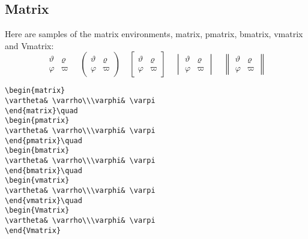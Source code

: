 \documentclass[draft]{amsart}
\newcommand{\ntt}{\normalfont\ttfamily}
\newcommand{\cn}[1]{{\protect\ntt\bslash#1}}
\theoremstyle{definition}
\theoremstyle{remark}
\begin{document}
\subsection{Matrix}

Here are samples of the matrix environments,
\cn{matrix}, \cn{pmatrix}, \cn{bmatrix}, \cn{vmatrix} and \cn{Vmatrix}:
\begin{equation}
\begin{matrix}
\vartheta& \varrho\\\varphi& \varpi
\end{matrix}\quad
\begin{pmatrix}
\vartheta& \varrho\\\varphi& \varpi
\end{pmatrix}\quad
\begin{bmatrix}
\vartheta& \varrho\\\varphi& \varpi
\end{bmatrix}\quad
\begin{vmatrix}
\vartheta& \varrho\\\varphi& \varpi
\end{vmatrix}\quad
\begin{Vmatrix}
\vartheta& \varrho\\\varphi& \varpi
\end{Vmatrix}
\end{equation}
\begin{verbatim}
\begin{matrix}
\vartheta& \varrho\\\varphi& \varpi
\end{matrix}\quad
\begin{pmatrix}
\vartheta& \varrho\\\varphi& \varpi
\end{pmatrix}\quad
\begin{bmatrix}
\vartheta& \varrho\\\varphi& \varpi
\end{bmatrix}\quad
\begin{vmatrix}
\vartheta& \varrho\\\varphi& \varpi
\end{vmatrix}\quad
\begin{Vmatrix}
\vartheta& \varrho\\\varphi& \varpi
\end{Vmatrix}
\end{verbatim}
\end{document}
